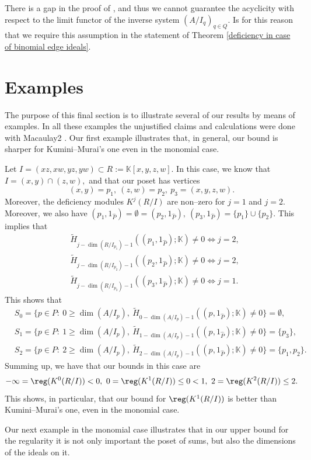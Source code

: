 \documentclass[11pt]{amsart}
\begin{document}
\begin{rk}\label{Alvarez Montaner remark}
There is a gap in the proof of \cite[Proposition 3.7]{AlvarezMontaner2020}, and thus we cannot guarantee the acyclicity with respect to the limit functor of the inverse system $(A/I_q)_{q\in Q}$. Is for this reason that we require this assumption in the statement of Theorem \ref{deficiency in case of binomial edge ideals}.
\end{rk}

\section{Examples}\label{section of examples}
The purpose of this final section is to illustrate several of our results by means of examples. In all these examples the unjustified claims and calculations were done with Macaulay2 \cite{M2}. Our first example illustrates that, in general, our bound is sharper for Kumini--Murai's one even in the monomial case.

\begin{ex}
Let $I=(xz,xw,yz,yw)\subset R:=\mathbb{K}[x,y,z,w].$ In this case, we know that $I=(x,y)\cap (z,w),$ and that our poset has vertices
\[
(x,y)=p_1,\ (z,w)=p_2,\ p_3=(x,y,z,w).
\]
Moreover, the deficiency modules $K^j (R/I)$ are non--zero for $j=1$ and $j=2$. Moreover, we also have $(p_1,1_{\widehat{P}})=\emptyset=(p_2,1_{\widehat{P}}),\ (p_3,1_{\widehat{P}})=\{p_1\}\cup\{p_2\}$. This implies that
\begin{align*}
& \widetilde{H}_{j-\dim (R/I_{p_1})-1}((p_1,1_{\widehat{P}});\mathbb{K})\neq 0\Longleftrightarrow j=2,\\
& \widetilde{H}_{j-\dim (R/I_{p_2})-1}((p_2,1_{\widehat{P}});\mathbb{K})\neq 0\Longleftrightarrow j=2,\\
& \widetilde{H}_{j-\dim (R/I_{p_3})-1}((p_3,1_{\widehat{P}});\mathbb{K})\neq 0\Longleftrightarrow j=1.
\end{align*}
This shows that
\begin{align*}
& S_0=\{p\in P:\ 0\geq\dim (A/I_p),\ \widetilde{H}_{0-\dim(A/I_p)-1}((p,1_{\widehat{P}});\mathbb{K})\neq 0\}=\emptyset,\\
& S_1=\{p\in P:\ 1\geq\dim (A/I_p),\ \widetilde{H}_{1-\dim(A/I_p)-1}((p,1_{\widehat{P}});\mathbb{K})\neq 0\}=\{p_3\},\\
& S_2=\{p\in P:\ 2\geq\dim (A/I_p),\ \widetilde{H}_{2-\dim(A/I_p)-1}((p,1_{\widehat{P}});\mathbb{K})\neq 0\}=\{p_1, p_2\}.
\end{align*}
Summing up, we have that our bounds in this case are
\[
-\infty=\reg(K^0 (R/I))<0,\ 0=\reg (K^1 (R/I))\leq 0<1,\ 2=\reg (K^2 (R/I))\leq 2.
\]
This shows, in particular, that our bound for $\reg (K^1 (R/I))$ is better than Kumini--Murai's one, even in the monomial case.
\end{ex}
Our next example in the monomial case illustrates that in our upper bound for the regularity it is not only important the poset of sums, but also the dimensions of the ideals on it.
\end{document}
